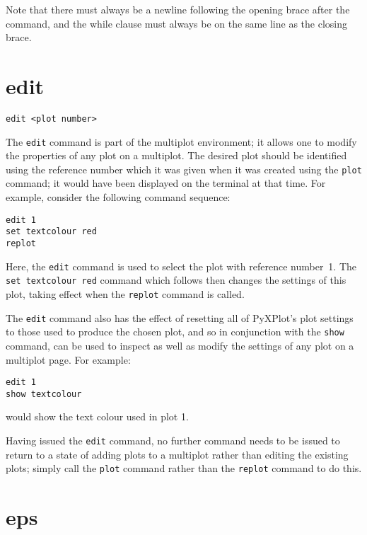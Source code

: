 Note that there must always be a newline following the opening brace after the
 command, and the while clause must always be on the same line as the
closing brace.

\section{edit}

\begin{verbatim}
edit <plot number>
\end{verbatim}

The {\tt edit} command is part of the multiplot environment; it allows one to
modify the properties of any plot on a multiplot. The desired plot should be
identified using the reference number which it was given when it was created
using the {\tt plot} command; it would have been displayed on the terminal at
that time. For example, consider the following command sequence:

\begin{verbatim}
edit 1
set textcolour red
replot
\end{verbatim}

\noindent Here, the {\tt edit} command is used to select the plot with
reference number~1. The {\tt set textcolour red} command which follows then
changes the settings of this plot, taking effect when the {\tt replot} command
is called.

The {\tt edit} command also has the effect of resetting all of PyXPlot's plot
settings to those used to produce the chosen plot, and so in conjunction with
the {\tt show} command, can be used to inspect as well as modify the settings of
any plot on a multiplot page. For example:

\begin{verbatim}
edit 1
show textcolour
\end{verbatim}

\noindent would show the text colour used in plot 1.

Having issued the {\tt edit} command, no further command needs to be issued to
return to a state of adding plots to a multiplot rather than editing the
existing plots; simply call the {\tt plot} command rather than the {\tt replot}
command to do this.

\section{eps}

